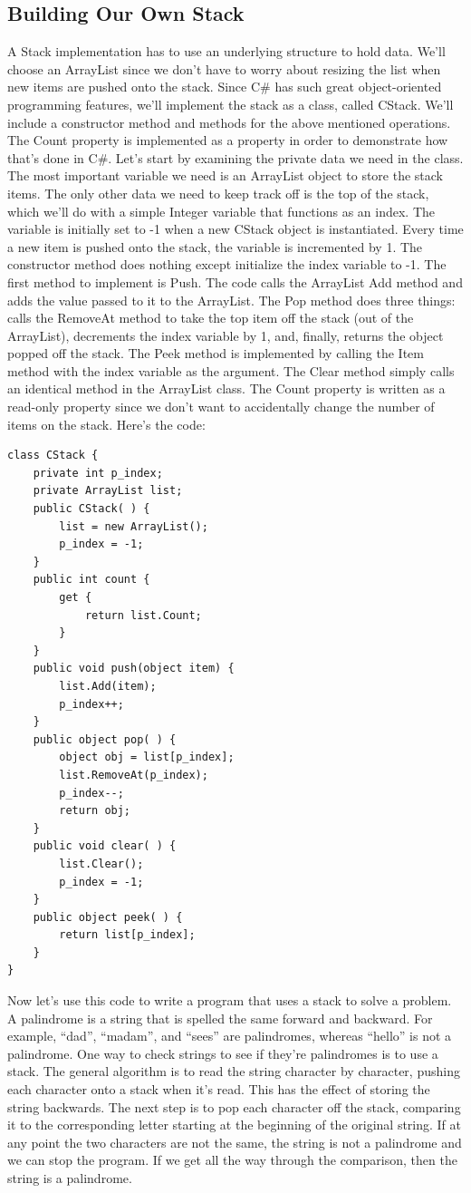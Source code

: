 \documentclass[12pt,a4paper,final,twoside,titlepage]{book}
\begin{document}
\subsection{Building Our Own Stack}
A Stack implementation has to use an underlying structure to hold data. We’ll choose an ArrayList since we don’t have to worry about resizing the list when new items are pushed onto the stack. Since C\# has such great object-oriented programming features, we’ll implement the stack as a class, called CStack. We’ll include a constructor method and methods for the above mentioned operations. The Count property is implemented as a property in order to demonstrate how that’s done in C\#. Let’s start by examining the private data we need in the class. The most important variable we need is an ArrayList object to store the stack items. The only other data we need to keep track off is the top of the stack, which we’ll do with a simple Integer variable that functions as an index. The variable is initially set to -1 when a new CStack object is instantiated. Every time a new item is pushed onto the stack, the variable is incremented by 1.
The constructor method does nothing except initialize the index variable to -1. The first method to implement is Push. The code calls the ArrayList Add method and adds the value passed to it to the ArrayList. The Pop method does three things: calls the RemoveAt method to take the top item off the stack (out of the ArrayList), decrements the index variable by 1, and, finally, returns the object popped off the stack.
The Peek method is implemented by calling the Item method with the index variable as the argument. The Clear method simply calls an identical method in the ArrayList class. The Count property is written as a read-only property since we don’t want to accidentally change the number of items on the stack.
Here’s the code:
\begin{lstlisting}
class CStack {
	private int p_index;
	private ArrayList list;
	public CStack( ) {
		list = new ArrayList();
		p_index = -1;
	}
	public int count {
		get {
    		return list.Count;
    	}
    }
    public void push(object item) {
    	list.Add(item);
    	p_index++;
    }
    public object pop( ) {
    	object obj = list[p_index];
    	list.RemoveAt(p_index);
    	p_index--;
    	return obj;
    }
    public void clear( ) {
    	list.Clear();
    	p_index = -1;
    }
    public object peek( ) {
    	return list[p_index];
    }
}
\end{lstlisting}
Now let’s use this code to write a program that uses a stack to solve a problem. A palindrome is a string that is spelled the same forward and backward. For example, “dad”, “madam”, and “sees” are palindromes, whereas “hello” is not a palindrome. One way to check strings to see if they’re palindromes is to use a stack. The general algorithm is to read the string character by character, pushing each character onto a stack when it’s read. This has the effect of storing the string backwards. The next step is to pop each character off the stack, comparing it to the corresponding letter starting at the beginning of the original string. If at any point the two characters are not the same, the string is not a palindrome and we can stop the program. If we get all the way through the comparison, then the string is a palindrome.
\end{document}
